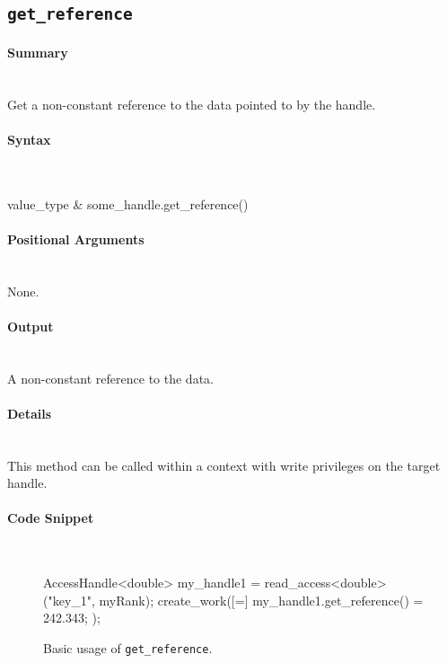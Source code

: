 \subsection{\texttt{get\_reference}}

\paragraph{Summary}\mbox{}\\
Get a non-constant reference to the data pointed to by the handle.

\paragraph{Syntax}\mbox{}\\
\begin{CppCode}
value_type & some_handle.get_reference()
\end{CppCode}

\paragraph{Positional Arguments}\mbox{}\\
None.

\paragraph{Output}\mbox{}\\
A non-constant reference to the data.  

\paragraph{Details}\mbox{}\\
This method can be called within a context with write privileges 
on the target handle.


\paragraph{Code Snippet}\mbox{}\\
\begin{figure}[!h]
\begin{CppCodeNumb}
AccessHandle<double> my_handle1 = read_access<double>("key_1", myRank);
create_work([=]{
	my_handle1.get_reference() = 242.343;
});
\end{CppCodeNumb}
\label{fig:fe_api_getreference}
\caption{Basic usage of \texttt{get\_reference}.}
\end{figure}



